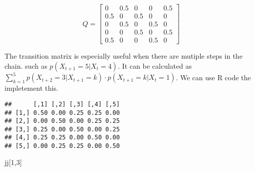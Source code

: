 \documentclass[
]{book}
\newenvironment{Shaded}{\begin{snugshade}}{\end{snugshade}}
\newcommand{\DataTypeTok}[1]{\textcolor[rgb]{0.13,0.29,0.53}{#1}}
\newcommand{\DecValTok}[1]{\textcolor[rgb]{0.00,0.00,0.81}{#1}}
\newcommand{\FloatTok}[1]{\textcolor[rgb]{0.00,0.00,0.81}{#1}}
\newcommand{\KeywordTok}[1]{\textcolor[rgb]{0.13,0.29,0.53}{\textbf{#1}}}
\newcommand{\NormalTok}[1]{#1}
\newcommand{\OperatorTok}[1]{\textcolor[rgb]{0.81,0.36,0.00}{\textbf{#1}}}
\newcommand{\OtherTok}[1]{\textcolor[rgb]{0.56,0.35,0.01}{#1}}
\newcommand{\StringTok}[1]{\textcolor[rgb]{0.31,0.60,0.02}{#1}}
\begin{document}
\[Q=\begin{bmatrix} 0 & 0.5 & 0 & 0 & 0.5 \\ 0.5 & 0 & 0.5 & 0 & 0\\ 0 & 0.5 & 0 & 0.5 & 0 \\ 0& 0 & 0.5& 0& 0.5\\ 0.5 & 0& 0 &0.5 & 0 \end{bmatrix}\]

The transition matrix is especially useful when there are mutiple steps in the chain. such as \(p(X_{t+1}=5| X_t=4)\). It can be calculated as \(\sum_{k=1}^{5} p(X_{t+2}=3|X_{t+1}=k) \cdot p(X_{t+1}=k |X_t=1)\). We can use R code the impletement this.

\begin{Shaded}
\end{Shaded}

\begin{verbatim}
##      [,1] [,2] [,3] [,4] [,5]
## [1,] 0.50 0.00 0.25 0.25 0.00
## [2,] 0.00 0.50 0.00 0.25 0.25
## [3,] 0.25 0.00 0.50 0.00 0.25
## [4,] 0.25 0.25 0.00 0.50 0.00
## [5,] 0.00 0.25 0.25 0.00 0.50
\end{verbatim}

\begin{Shaded}
\begin{Highlighting}[]
\NormalTok{jj[}\DecValTok{1}\NormalTok{,}\DecValTok{3}\NormalTok{]}
\end{Highlighting}
\end{Shaded}
\end{document}
